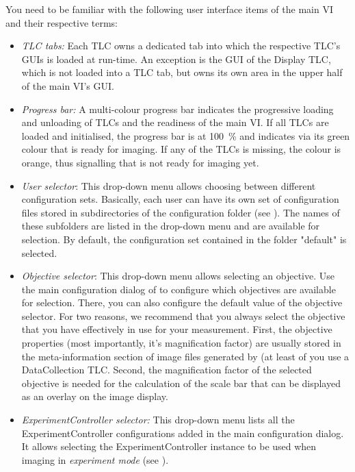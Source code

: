 You need to be familiar with the following user interface items of the \HS main \ac{VI} and their respective terms:
\begin{itemize}
	\item \textit{\ac{TLC} tabs:} Each \ac{TLC} owns a dedicated tab into which the respective \ac{TLC}'s \acp{GUI} is loaded at run-time. An exception is the \ac{GUI} of the Display \ac{TLC}, which is not loaded into a \ac{TLC} tab, but owns its own area in the upper half of the main \ac{VI}'s \ac{GUI}. 
	\item \textit{Progress bar:} A multi-colour progress bar indicates the progressive loading and unloading of \acp{TLC} and the readiness of the main \ac{VI}. If all \acp{TLC} are loaded and initialised, the progress bar is at \SI{100}{\percent} and indicates via its green colour that \HS is ready for imaging. If any of the \acp{TLC} is missing, the colour is orange, thus signalling that \HS is not ready for imaging yet. 
	\item \textit{User selector}: This drop-down menu allows choosing between different configuration sets. Basically, each user can have its own set of configuration files stored in subdirectories of the \HS configuration folder (see ). The names of these subfolders are listed in the drop-down menu and are available for selection. By default, the configuration set contained in the folder "default" is selected.
	\item \textit{Objective selector}: This drop-down menu allows selecting an objective. Use the main configuration dialog of \HS to configure which objectives are available for selection. There, you can also configure the default value of the objective selector. For two reasons, we recommend that you always select the objective that you have effectively in use for your measurement.  First, the objective properties (most importantly, it's magnification factor) are usually stored in the meta-information section of image files generated by \HS (at least of you use a DataCollection \ac{TLC}. Second, the magnification factor of the selected objective is needed for the calculation of the scale bar that can be displayed as an overlay on the image display. 
	\item \textit{ExperimentController selector:} This drop-down menu lists all the ExperimentController configurations added in the \HS main configuration dialog. It allows selecting the ExperimentController instance to be used when imaging in \textit{experiment mode} (see ).

\end{itemize}
